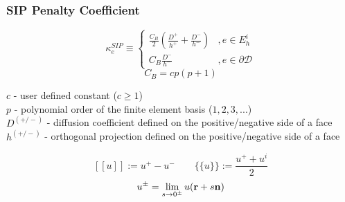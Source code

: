 \documentclass[compress,10pt]{beamer}
\begin{document}
\begin{frame}[t]\frametitle{SIP Penalty Coefficient}
\begin{block}{}{
	\begin{equation*}
		\kappa_e^{SIP} \equiv 
		\begin{cases}
		\frac{C_B}{2} \left(  \frac{D^+}{h^+} + \frac{D^-}{h^-}  \right) & , e \in E_h^i \\
		C_B \frac{D^-}{h^-}  & , e \in \partial \mathcal{D}
		\end{cases}
	\end{equation*}}
	\begin{equation*}
		C_B = c p (p+1)
	\end{equation*}
\end{block}
\begin{block}{}
$c$ - user defined constant ($c \geq 1$) \\
$p$ - polynomial order of the finite element basis ($1,2,3,...$) \\
$D^{(+/-)}$ - diffusion coefficient defined on the positive/negative side of a face\\
$h^{(+/-)}$ - orthogonal projection defined on the positive/negative side of a face
\end{block}
\begin{block}{}
\[
[\![ u ]\!] := u^+ - u^- \qquad  \{\!\{  u \}\!\} := \frac{u^+ + u^i}{2}
\]
	\begin{equation*}
		u^{\pm} = \lim_{s \rightarrow 0^{\pm}} u ({\bf r} + s {\bf n})
	\end{equation*}
\end{block}
\end{frame}
\end{document}
